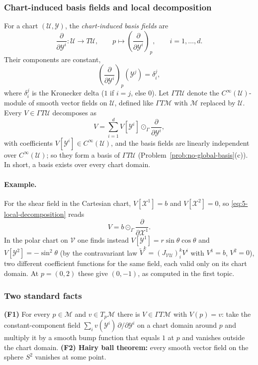 \documentclass[11pt]{article}
\newcommand{\TpM}{T_p\mathcal M}
\begin{document}
\subsubsection*{Chart-induced basis fields and local decomposition}
For a chart $(\mathcal U,\mathcal Y)$, the \emph{chart-induced basis fields} are
\[
\frac{\partial}{\partial\mathcal Y^i}:\mathcal U\to T\mathcal U,\qquad p\mapsto\left(\frac{\partial}{\partial\mathcal Y^i}\right)_p,\qquad i=1,\dots,d.
\]
Their components are constant,
\[
\left(\frac{\partial}{\partial\mathcal Y^i}\right)_p(\mathcal Y^j)=\delta^j_i,
\]
where $\delta^j_i$ is the Kronecker delta ($1$ if $i=j$, else $0$). Let $\Gamma T\mathcal U$ denote the $C^\infty(\mathcal U)$-module of smooth vector fields on $\mathcal U$, defined like $\Gamma T\mathcal M$ with $\mathcal M$ replaced by $\mathcal U$. Every $V\in\Gamma T\mathcal U$ decomposes as
\begin{equation}
V=\sum_{i=1}^dV[\mathcal Y^i]\odot_\Gamma\frac{\partial}{\partial\mathcal Y^i},
\tag{5.6}\label{eq:5-local-decomposition}
\end{equation}
with coefficients $V[\mathcal Y^i]\in C^\infty(\mathcal U)$, and the basis fields are linearly independent over $C^\infty(\mathcal U)$; so they form a basis of $\Gamma T\mathcal U$ (Problem~\ref{prob:no-global-basis}(c)). In short, a basis exists over every chart domain.

\paragraph{Example.} For the shear field in the Cartesian chart, $V[\mathcal X^1]=b$ and $V[\mathcal X^2]=0$, so \eqref{eq:5-local-decomposition} reads
\[
V=b\odot_\Gamma\frac{\partial}{\partial\mathcal X^1}.
\]
In the polar chart on $\mathcal V$ one finds instead $V[\mathcal Y^1]=r\sin\theta\cos\theta$ and $V[\mathcal Y^2]=-\sin^2\theta$ (by the contravariant law $\widetilde V^k=(J_{\mathcal{VU}})^k_iV^i$ with $V^1=b$, $V^2=0$), two different coefficient functions for the same field, each valid only on its chart domain. At $p=(0,2)$ these give $(0,-1)$, as computed in the first topic.

\subsubsection*{Two standard facts}
\textbf{(F1)} For every $p\in\mathcal M$ and $v\in\TpM$ there is $V\in\Gamma T\mathcal M$ with $V(p)=v$: take the constant-component field $\sum_iv(\mathcal Y^i)\,\partial/\partial\mathcal Y^i$ on a chart domain around $p$ and multiply it by a smooth bump function that equals $1$ at $p$ and vanishes outside the chart domain. \textbf{(F2) Hairy ball theorem:} every smooth vector field on the sphere $S^2$ vanishes at some point.
\end{document}
